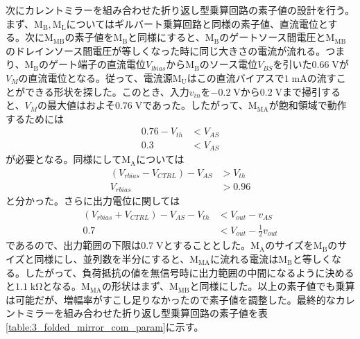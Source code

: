             次にカレントミラーを組み合わせた折り返し型乗算回路の素子値の設計を行う。まず、$\mathrm{M_{B},M_{L}}$についてはギルバート乗算回路と同様の素子値、直流電位とする。次に$\mathrm{M_{MB}}$の素子値を$\mathrm{M_{B}}$と同様にすると、$\mathrm{M_{B}}$のゲートソース間電圧と$\mathrm{M_{MB}}$のドレインソース間電圧が等しくなった時に同じ大きさの電流が流れる。つまり、$\mathrm{M_{B}}$のゲート端子の直流電位$V_{lbias}$から$\mathrm{M_{B}}$のソース電位$V_{BS}$を引いた$0.66\;\mathrm{V}$が$V_{M}$の直流電位となる。従って、電流源$\mathrm{M_{U}}$はこの直流バイアスで$1\;\mathrm{mA}$の流すことができる形状を探した。このとき、入力$v_{in}$を$-0.2\;\mathrm{V}$から$0.2\;\mathrm{V}$まで掃引すると、$V_{M}$の最大値はおよそ$0.76\;\mathrm{V}$であった。したがって、$\mathrm{M_{MA}}$が飽和領域で動作するためには
            \begin{align*}
                0.76-V_{th} &< V_{AS}      \\
                0.3 &< V_{AS}
            \end{align*}
            が必要となる。同様にして$\mathrm{M_{A}}$については
            \begin{align*}
                \left( V_{rbias}-V_{CTRL} \right) -V_{AS} &> V_{th}     \\
                V_{rbias} &> 0.96
            \end{align*}
            と分かった。さらに出力電位に関しては
            \begin{align*}
                \left( V_{rbias}+V_{CTRL} \right) - V_{AS} - V_{th} &< V_{out} - v_{AS} \\
                0.7 &< V_{out} - \frac{1}{2}v_{out}
            \end{align*}
            であるので、出力範囲の下限は$0.7\;\mathrm{V}$とすることとした。$\mathrm{M_{A}}$のサイズを$\mathrm{M_{B}}$のサイズと同様にし、並列数を半分にすると、$\mathrm{M_{MA}}$に流れる電流は$\mathrm{M_{B}}$と等しくなる。したがって、負荷抵抗の値を無信号時に出力範囲の中間になるように決めると$1.1\;\mathrm{k\Omega}$となる。$\mathrm{M_{MA}}$の形状はまず、$\mathrm{M_{MB}}$と同様にした。以上の素子値でも乗算は可能だが、増幅率がすこし足りなかったので素子値を調整した。最終的なカレントミラーを組み合わせた折り返し型乗算回路の素子値を表\ref{table:3_folded_mirror_com_param}に示す。
